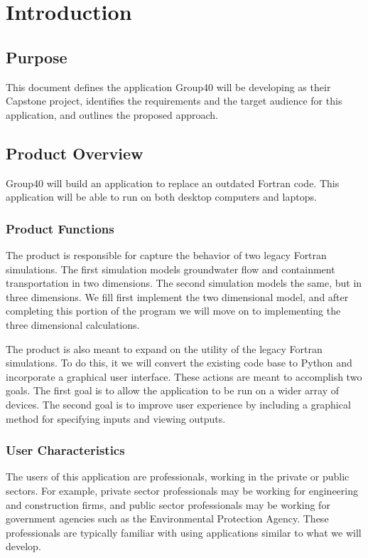 \documentclass[draftclsnofoot,onecolumn,letterpaper,10pt,compsoc]{IEEEtran}
\begin{document}

\tableofcontents

\newpage

\section{Introduction}
\subsection{Purpose}
This document defines the application Group40 will be developing as their Capstone project, identifies the requirements and the target audience for this application, and outlines the proposed approach.

\subsection{Product Overview}
Group40 will build an application to replace an outdated Fortran code. This application will be able to run on both desktop computers and laptops. 

\subsubsection{Product Functions}
The product is responsible for capture the behavior of two legacy Fortran simulations. The first simulation models groundwater flow and containment transportation in two dimensions. The second simulation models the same, but in three dimensions. We fill first implement the two dimensional model, and after completing this portion of the program we will move on to implementing the three dimensional calculations.

The product is also meant to expand on the utility of the legacy Fortran simulations. To do this, it we will convert the existing code base to Python and incorporate a graphical user interface. These actions are meant to accomplish two goals. The first goal is to allow the application to be run on a wider array of devices. The second goal is to improve user experience by including a graphical method for specifying inputs and viewing outputs. 

\subsubsection{User Characteristics}
The users of this application are professionals, working in the private or public sectors. For example, private sector professionals may be working for engineering and construction firms, and public sector professionals may be working for government agencies such as the Environmental Protection Agency. These professionals are typically familiar with using applications similar to what we will develop.
\end{document}
